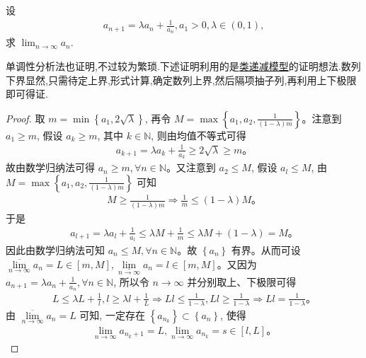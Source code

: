 \documentclass[../../main.tex]{subfiles}%
\begin{document}
\begin{example}
设
\begin{align*}
a_{n+1} = \lambda a_n + \frac{1}{a_n}, a_1 > 0, \lambda \in (0,1),
\end{align*}
求 $\lim_{n \to \infty} a_n$.
\end{example}
\begin{note}
单调性分析法也证明,不过较为繁琐.下述证明利用的是\hyperref[Basis of Analytics-example:类递减模型]{类递减模型}的证明想法.数列下界显然,只需待定上界,形式计算,确定数列上界,然后隔项抽子列,再利用上下极限即可得证.
\end{note}
\begin{proof}
取 $m=\min \left\{ a_1,2\sqrt{\lambda} \right\}$, 再令 $M=\max \left\{ a_1,a_2,\frac{1}{\left( 1-\lambda \right) m} \right\}$。注意到 $a_1\geqslant m$, 假设 $a_k\geqslant m$, 其中 $k\in \mathbb{N}$, 则由均值不等式可得
\begin{align*}
a_{k+1}=\lambda a_k+\frac{1}{a_k}\geqslant 2\sqrt{\lambda}\geqslant m。
\end{align*}
故由数学归纳法可得 $a_n\geqslant m,\forall n\in \mathbb{N}$。又注意到 $a_2\leqslant M$, 假设 $a_l\leqslant M$, 由 $M=\max \left\{ a_1,a_2,\frac{1}{\left( 1-\lambda \right) m} \right\}$ 可知
\begin{align*}
M\geqslant \frac{1}{\left( 1-\lambda \right) m}\Rightarrow \frac{1}{m}\leqslant \left( 1-\lambda \right) M。
\end{align*}
于是
\begin{align*}
a_{l+1}=\lambda a_l+\frac{1}{a_l}\leqslant \lambda M+\frac{1}{m}\leqslant \lambda M+\left( 1-\lambda \right) =M。
\end{align*}
因此由数学归纳法可知 $a_n\leqslant M,\forall n\in \mathbb{N}$。故 $\left\{ a_n \right\}$ 有界。从而可设 $\underset{n\rightarrow \infty}{\overline{\lim }}a_n=L\in \left[ m,M \right] ,\underset{n\rightarrow \infty}{\underline{\lim }}a_n=l\in \left[ m,M \right]$。又因为 $a_{n+1}=\lambda a_n+\frac{1}{a_n},\forall n\in \mathbb{N}$, 所以令 $n\rightarrow \infty$ 并分别取上、下极限可得
\begin{align*}
L\leqslant \lambda L+\frac{1}{l},l\geqslant \lambda l+\frac{1}{L}\Rightarrow Ll\leqslant \frac{1}{1-\lambda},Ll\geqslant \frac{1}{1-\lambda}\Rightarrow Ll=\frac{1}{1-\lambda}。
\end{align*}
由 $\underset{n\rightarrow \infty}{\overline{\lim }}a_n=L$ 可知, 一定存在 $\left\{ a_{n_k} \right\} \subset \left\{ a_n \right\}$, 使得
\begin{align*}
\underset{n\rightarrow \infty}{\lim}a_{n_k+1}=L,\underset{n\rightarrow \infty}{\lim}a_{n_k}=s\in \left[ l,L \right]。

\end{align*}
\end{proof}
\end{document}
